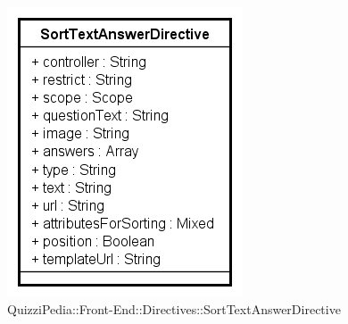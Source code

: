 		\begin{figure}[ht]
			\centering
			\includegraphics[scale=0.80,keepaspectratio]{UML/Classi/Front-End/QuizziPedia_Front-end_Templates_SortTextAnswerTemplate.png}
			\caption{QuizziPedia::Front-End::Directives::SortTextAnswerDirective}
		\end{figure} \FloatBarrier
		
